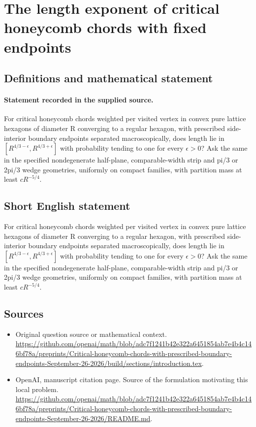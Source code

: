 \documentclass[11pt]{article}
\begin{document}
\section*{The length exponent of critical honeycomb chords with fixed endpoints}\label{statement}
\subsection{Definitions and mathematical statement}
\paragraph{Statement recorded in the supplied source.}
For critical honeycomb chords weighted per visited vertex in convex pure lattice hexagons of diameter R converging to a regular hexagon, with prescribed side-interior boundary endpoints separated macroscopically, does length lie in $[R^{4/3-\epsilon },R^{4/3+\epsilon }]$ with probability tending to one for every $\epsilon >0$? Ask the same in the specified nondegenerate half-plane, comparable-width strip and pi/3 or 2pi/3 wedge geometries, uniformly on compact families, with partition mass at least $cR^{-5/4}$.
\subsection{Short English statement}
For critical honeycomb chords weighted per visited vertex in convex pure lattice hexagons of diameter R converging to a regular hexagon, with prescribed side-interior boundary endpoints separated macroscopically, does length lie in $[R^{4/3-\epsilon },R^{4/3+\epsilon }]$ with probability tending to one for every $\epsilon >0$? Ask the same in the specified nondegenerate half-plane, comparable-width strip and pi/3 or 2pi/3 wedge geometries, uniformly on compact families, with partition mass at least $cR^{-5/4}$.
\subsection{Sources}
\begin{itemize}
\item[S1] Original question source or mathematical context.
\url{https://github.com/openai/math/blob/adc7f1241b42e322a6451854ab7e4b4c146bf78a/preprints/Critical-honeycomb-chords-with-prescribed-boundary-endpoints-September-26-2026/build/sections/introduction.tex}.
\item[S2] OpenAI, manuscript citation page. Source of the formulation motivating this local problem.
\url{https://github.com/openai/math/blob/adc7f1241b42e322a6451854ab7e4b4c146bf78a/preprints/Critical-honeycomb-chords-with-prescribed-boundary-endpoints-September-26-2026/README.md}.
\end{itemize}
\end{document}
